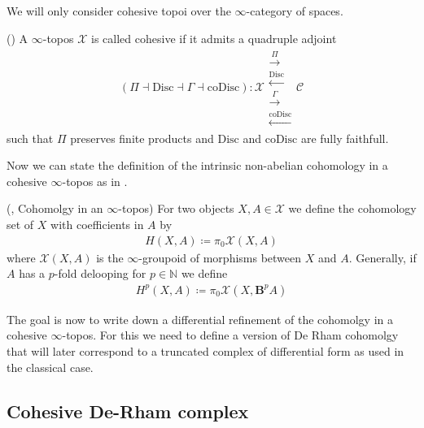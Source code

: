 \documentclass[10pt]{amsart}
\begin{document}
We will only consider cohesive topoi over the $\infty$-category of
spaces.

\begin{definition}
  (\cite[Rmk. 3.4.2.]{schreiber2013cohesive})
  A $\infty$-topos $\mathcal{X}$ is called cohesive if it admits a
  quadruple adjoint
   \begin{align*}
    (\Pi \dashv \mathrm{Disc} \dashv \Gamma
    \dashv \mathrm{coDisc}) \colon \mathcal{X}
    \mathrel{\substack{
     \textstyle\overset{\Pi}\longrightarrow\\[-0.2ex]
    \textstyle\overset{\mathrm{Disc}}\longleftarrow \\[-0.2ex]
    \textstyle\overset{\Gamma}\longrightarrow \\[-0.2ex]
    \textstyle\overset{\mathrm{coDisc}}\longleftarrow}
    }
    \mathcal{C}
   \end{align*}
   such that $\Pi$ preserves finite products and $\mathrm{Disc}$ and
   $\mathrm{coDisc}$ are fully faithfull.
\end{definition}

Now we can state the definition of the intrinsic non-abelian
cohomology in a cohesive $\infty$-topos as in
\cite[Def. 3.6.134.]{schreiber2013cohesive}.

\begin{definition}
  (\cite[Def. 3.6.134.]{schreiber2013cohesive}, Cohomolgy in an
  $\infty$-topos)
  For two objects $X,A \in \mathcal{X}$ we define the cohomology set
  of $X$ with coefficients in $A$ by
  \begin{align*}
    H(X,A) \coloneqq \pi_0\mathcal{X}(X,A)
  \end{align*}
  where $\mathcal{X}(X,A)$ is the $\infty$-groupoid of morphisms
  between $X$ and $A$. Generally, if $A$ has a $p$-fold delooping for
  $p\in \mathbb{N}$ we define
  \begin{align*}
    H^p(X,A) \coloneqq \pi_0\mathcal{X}(X,\mathbf{B}^pA)
  \end{align*}
\end{definition}

The goal is now to write down a differential refinement of the
cohomolgy in a cohesive $\infty$-topos. For this we need to define a
version of De Rham cohomolgy that will later correspond to a truncated
complex of differential form as used in the classical case.

\subsection{Cohesive De-Rham complex}
\end{document}
